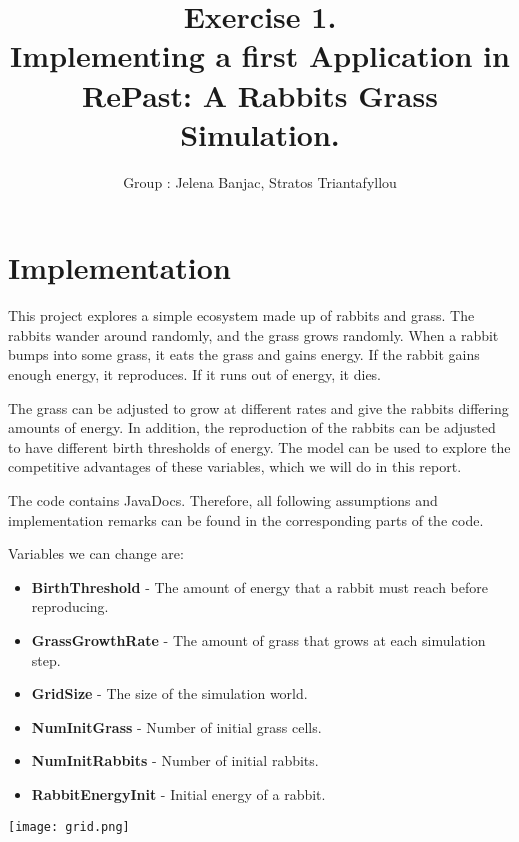 \documentclass[11pt]{article}
\title{\bf Exercise 1.\\ Implementing a first Application in RePast: A Rabbits Grass Simulation.}
\author{Group \textnumero 70: Jelena Banjac, Stratos Triantafyllou}
\begin{document}
\maketitle

\section{Implementation}

This project explores a simple ecosystem made up of rabbits and grass. The rabbits wander around randomly, and the grass grows randomly. When a rabbit bumps into some grass, it eats the grass and gains energy. If the rabbit gains enough energy, it reproduces. If it runs out of energy, it dies.

The grass can be adjusted to grow at different rates and give the rabbits differing amounts of energy. In addition, the reproduction of the rabbits can be adjusted to have different birth thresholds of energy. The model can be used to explore the competitive advantages of these variables, which we will do in this report.

The code contains JavaDocs. Therefore, all following assumptions and implementation remarks can be found in the corresponding parts of the code.


\begin{multicols}{2}
Variables we can change are:
\begin{itemize}
\item \textbf{BirthThreshold} - The amount of energy that a rabbit must reach before reproducing.
\item \textbf{GrassGrowthRate} - The amount of grass that grows at each simulation step.
\item \textbf{GridSize} - The size of the simulation world.
\item \textbf{NumInitGrass} - Number of initial grass cells.
\item \textbf{NumInitRabbits} - Number of initial rabbits.
\item \textbf{RabbitEnergyInit} - Initial energy of a rabbit.
\end{itemize}

\texttt{[image: grid.png]}

\end{multicols}
\end{document}
